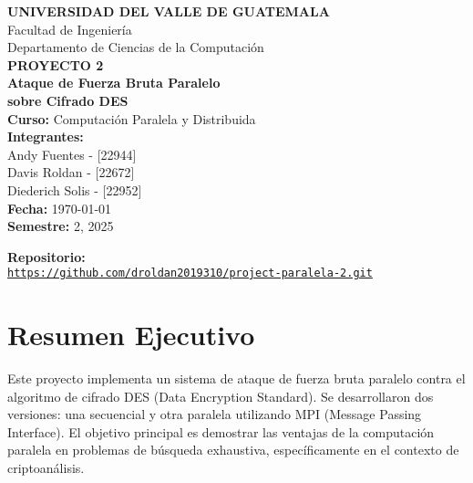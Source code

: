 \documentclass[12pt,letterpaper]{article}
\begin{document}
\begin{titlepage}
    \centering
    
    
    {\LARGE \textbf{UNIVERSIDAD DEL VALLE DE GUATEMALA}}\\[0.5cm]
    {\Large Facultad de Ingeniería}\\[0.3cm]
    {\large Departamento de Ciencias de la Computación}\\[1.5cm]
    
    {\huge \textbf{PROYECTO 2}}\\[0.5cm]
    {\LARGE \textbf{Ataque de Fuerza Bruta Paralelo}}\\[0.3cm]
    {\LARGE \textbf{sobre Cifrado DES}}\\[1.5cm]
    
    {\large \textbf{Curso:} Computación Paralela y Distribuida}\\[0.3cm]
    
    {\large \textbf{Integrantes:}}\\[0.2cm]
    {\large Andy Fuentes - [22944]}\\
    {\large Davis Roldan - [22672]}\\
    {\large Diederich Solis - [22952]}\\[1.5cm]
    
    {\large \textbf{Fecha:} \today}\\[0.5cm]
    {\large \textbf{Semestre:} 2, 2025}

      {\large \textbf{Repositorio:}}\\[0.2cm]
    \href{https://github.com/droldan2019310/project-paralela-2.git}{\texttt{https://github.com/droldan2019310/project-paralela-2.git}}

    
    \vfill
\end{titlepage}

\tableofcontents
\newpage

\listoffigures
\listoftables
\newpage

\section{Resumen Ejecutivo}

Este proyecto implementa un sistema de ataque de fuerza bruta paralelo contra el algoritmo de cifrado DES (Data Encryption Standard). Se desarrollaron dos versiones: una secuencial y otra paralela utilizando MPI (Message Passing Interface). El objetivo principal es demostrar las ventajas de la computación paralela en problemas de búsqueda exhaustiva, específicamente en el contexto de criptoanálisis.
\end{document}
